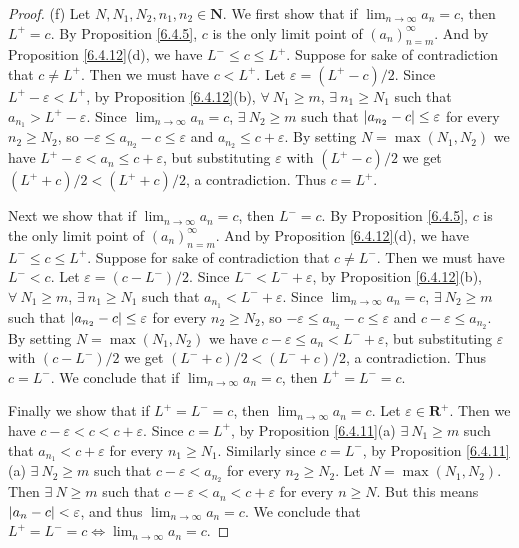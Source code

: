 \begin{proof}{(f)}
    Let \(N, N_1, N_2, n_1, n_2 \in \mathbf{N}\).
    We first show that if \(\lim_{n \to \infty} a_n = c\), then \(L^+ = c\).
    By Proposition \ref{6.4.5}, \(c\) is the only limit point of \((a_n)_{n = m}^\infty\).
    And by Proposition \ref{6.4.12}(d), we have \(L^- \leq c \leq L^+\).
    Suppose for sake of contradiction that \(c \neq L^+\).
    Then we must have \(c < L^+\).
    Let \(\varepsilon = (L^+ - c) / 2\).
    Since \(L^+ - \varepsilon < L^+\), by Proposition \ref{6.4.12}(b), \(\forall\ N_1 \geq m\), \(\exists\ n_1 \geq N_1\) such that \(a_{n_1} > L^+ - \varepsilon\).
    Since \(\lim_{n \to \infty} a_n = c\), \(\exists\ N_2 \geq m\) such that \(\abs*{a_{n_2} - c} \leq \varepsilon\) for every \(n_2 \geq N_2\), so \(-\varepsilon \leq a_{n_2} - c \leq \varepsilon\) and \(a_{n_2} \leq c + \varepsilon\).
    By setting \(N = \max(N_1, N_2)\) we have \(L^+ - \varepsilon < a_n \leq c + \varepsilon\), but substituting \(\varepsilon\) with \((L^+ - c) / 2\) we get \((L^+ + c) / 2 < (L^+ + c) / 2\), a contradiction.
    Thus \(c = L^+\).

    Next we show that if \(\lim_{n \to \infty} a_n = c\), then \(L^- = c\).
    By Proposition \ref{6.4.5}, \(c\) is the only limit point of \((a_n)_{n = m}^\infty\).
    And by Proposition \ref{6.4.12}(d), we have \(L^- \leq c \leq L^+\).
    Suppose for sake of contradiction that \(c \neq L^-\).
    Then we must have \(L^- < c\).
    Let \(\varepsilon = (c - L^-) / 2\).
    Since \(L^- < L^- + \varepsilon\), by Proposition \ref{6.4.12}(b), \(\forall\ N_1 \geq m\), \(\exists\ n_1 \geq N_1\) such that \(a_{n_1} < L^- + \varepsilon\).
    Since \(\lim_{n \to \infty} a_n = c\), \(\exists\ N_2 \geq m\) such that \(\abs*{a_{n_2} - c} \leq \varepsilon\) for every \(n_2 \geq N_2\), so \(-\varepsilon \leq a_{n_2} - c \leq \varepsilon\) and \(c - \varepsilon \leq a_{n_2}\).
    By setting \(N = \max(N_1, N_2)\) we have \(c - \varepsilon \leq a_n < L^- + \varepsilon\), but substituting \(\varepsilon\) with \((c - L^-) / 2\) we get \((L^- + c) / 2 < (L^- + c) / 2\), a contradiction.
    Thus \(c = L^-\).
    We conclude that if \(\lim_{n \to \infty} a_n = c\), then \(L^+ = L^- = c\).

    Finally we show that if \(L^+ = L^- = c\), then \(\lim_{n \to \infty} a_n = c\).
    Let \(\varepsilon \in \mathbf{R}^+\).
    Then we have \(c - \varepsilon < c < c + \varepsilon\).
    Since \(c = L^+\), by Proposition \ref{6.4.11}(a) \(\exists\ N_1 \geq m\) such that \(a_{n_1} < c + \varepsilon\) for every \(n_1 \geq N_1\).
    Similarly since \(c = L^-\), by Proposition \ref{6.4.11}(a) \(\exists\ N_2 \geq m\) such that \(c - \varepsilon < a_{n_2}\) for every \(n_2 \geq N_2\).
    Let \(N = \max(N_1, N_2)\).
    Then \(\exists\ N \geq m\) such that \(c - \varepsilon < a_n < c + \varepsilon\) for every \(n \geq N\).
    But this means \(\abs*{a_n - c} < \varepsilon\), and thus \(\lim_{n \to \infty} a_n = c\).
    We conclude that \(L^+ = L^- = c \iff \lim_{n \to \infty} a_n = c\).
\end{proof}

